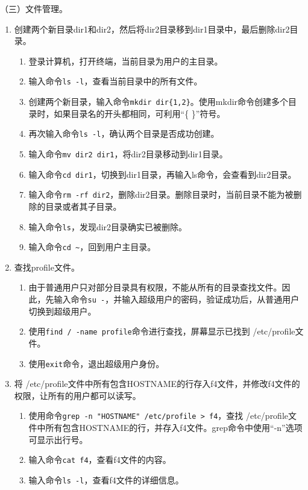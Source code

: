 \vspace{0.1in}
（三）文件管理。
\begin{enumerate}
  \item 创建两个新目录dir1和dir2，然后将dir2目录移到dir1目录中，最后删除dir2目录。
    \begin{enumerate}
      \item 登录计算机，打开终端，当前目录为用户的主目录。
      \item 输入命令\verb|ls -l|，查看当前目录中的所有文件。
      \item 创建两个新目录，输入命令\verb|mkdir dir{1,2}|。使用mkdir命令创建多个目录时，如果目录名的开头都相同，可利用“\{ \}”符号。
      \item 再次输入命令\verb|ls -l|，确认两个目录是否成功创建。
      \item 输入命令\verb|mv dir2 dir1|，将dir2目录移动到dir1目录。
      \item 输入命令\verb|cd dir1|，切换到dir1目录，再输入ls命令，会查看到dir2目录。
      \item 输入命令\verb|rm -rf dir2|，删除dir2目录。删除目录时，当前目录不能为被删除的目录或者其子目录。
      \item 输入命令\verb|ls|，发现dir2目录确实已被删除。
      \item 输入命令\verb|cd ~|，回到用户主目录。
    \end{enumerate}
  \item 查找profile文件。
    \begin{enumerate}
      \item 由于普通用户只对部分目录具有权限，不能从所有的目录查找文件。因此，先输入命令\verb|su -|，并输入超级用户的密码，验证成功后，从普通用户切换到超级用户。
      \item 使用\verb|find / -name profile|命令进行查找，屏幕显示已找到 /etc/profile文件。
      \item 使用\verb|exit|命令，退出超级用户身份。
    \end{enumerate}
  \item 将 /etc/profile文件中所有包含HOSTNAME的行存入f4文件，并修改f4文件的权限，让所有的用户都可以读写。
    \begin{enumerate}
      \item 使用命令\verb|grep -n "HOSTNAME" /etc/profile > f4|，查找 /etc/profile文件中所有包含HOSTNAME的行，并存入f4文件。grep命令中使用“-n”选项可显示出行号。
      \item 输入命令\verb|cat f4|，查看f4文件的内容。
      \item 输入命令\verb|ls -l|，查看f4文件的详细信息。

\end{enumerate}
\end{enumerate}
